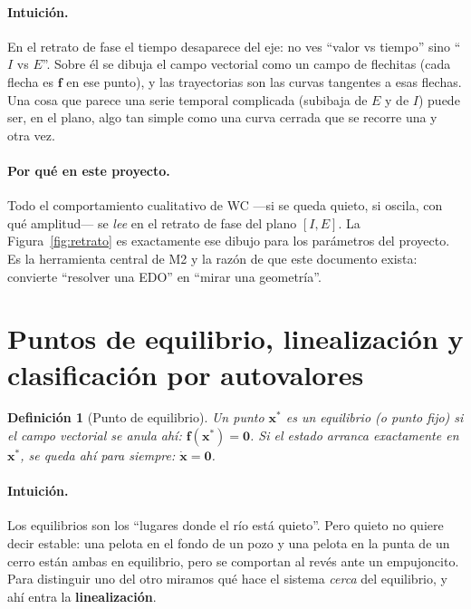 \documentclass[11pt,a4paper]{article}
\newtheorem{definition}{Definición}
\begin{document}
\paragraph{Intuición.} En el retrato de fase el tiempo desaparece del eje: no ves ``valor vs tiempo'' sino ``$I$ vs $E$''. Sobre él se dibuja el campo vectorial como un campo de flechitas (cada flecha es $\mathbf{f}$ en ese punto), y las trayectorias son las curvas tangentes a esas flechas. Una cosa que parece una serie temporal complicada (subibaja de $E$ y de $I$) puede ser, en el plano, algo tan simple como una curva cerrada que se recorre una y otra vez.

\paragraph{Por qué en este proyecto.} Todo el comportamiento cualitativo de WC ---si se queda quieto, si oscila, con qué amplitud--- se \emph{lee} en el retrato de fase del plano $[I,E]$. La Figura~\ref{fig:retrato} es exactamente ese dibujo para los parámetros del proyecto. Es la herramienta central de M2 y la razón de que este documento exista: convierte ``resolver una EDO'' en ``mirar una geometría''.

\section{Puntos de equilibrio, linealización y clasificación por autovalores}

\begin{definition}[Punto de equilibrio]
Un punto $\mathbf{x}^{*}$ es un equilibrio (o punto fijo) si el campo vectorial se anula ahí: $\mathbf{f}(\mathbf{x}^{*})=\mathbf{0}$. Si el estado arranca exactamente en $\mathbf{x}^{*}$, se queda ahí para siempre: $\dot{\mathbf{x}}=\mathbf{0}$.
\end{definition}

\paragraph{Intuición.} Los equilibrios son los ``lugares donde el río está quieto''. Pero quieto no quiere decir estable: una pelota en el fondo de un pozo y una pelota en la punta de un cerro están ambas en equilibrio, pero se comportan al revés ante un empujoncito. Para distinguir uno del otro miramos qué hace el sistema \emph{cerca} del equilibrio, y ahí entra la \textbf{linealización}.
\end{document}
